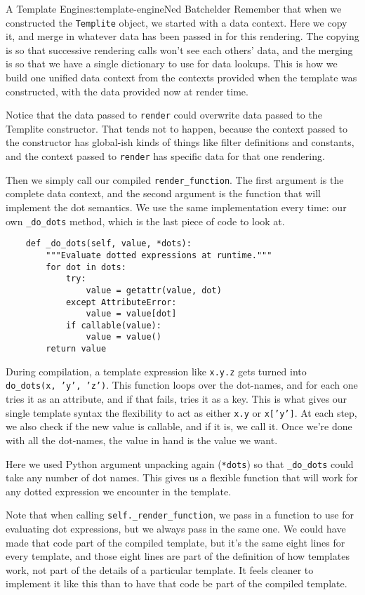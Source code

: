 \begin{aosachapter}{A Template Engine}{s:template-engine}{Ned Batchelder}
Remember that when we constructed the \texttt{Templite} object, we
started with a data context. Here we copy it, and merge in whatever data
has been passed in for this rendering. The copying is so that successive
rendering calls won't see each others' data, and the merging is so that
we have a single dictionary to use for data lookups. This is how we
build one unified data context from the contexts provided when the
template was constructed, with the data provided now at render time.

Notice that the data passed to \texttt{render} could overwrite data
passed to the Templite constructor. That tends not to happen, because
the context passed to the constructor has global-ish kinds of things
like filter definitions and constants, and the context passed to
\texttt{render} has specific data for that one rendering.

Then we simply call our compiled \texttt{render\_function}. The first
argument is the complete data context, and the second argument is the
function that will implement the dot semantics. We use the same
implementation every time: our own \texttt{\_do\_dots} method, which is
the last piece of code to look at.

\begin{verbatim}
    def _do_dots(self, value, *dots):
        """Evaluate dotted expressions at runtime."""
        for dot in dots:
            try:
                value = getattr(value, dot)
            except AttributeError:
                value = value[dot]
            if callable(value):
                value = value()
        return value
\end{verbatim}

During compilation, a template expression like \texttt{x.y.z} gets
turned into \texttt{do\_dots(x, 'y', 'z')}. This function loops over the
dot-names, and for each one tries it as an attribute, and if that fails,
tries it as a key. This is what gives our single template syntax the
flexibility to act as either \texttt{x.y} or \texttt{x{[}'y'{]}}. At
each step, we also check if the new value is callable, and if it is, we
call it. Once we're done with all the dot-names, the value in hand is
the value we want.

Here we used Python argument unpacking again (\texttt{*dots}) so that
\texttt{\_do\_dots} could take any number of dot names. This gives us a
flexible function that will work for any dotted expression we encounter
in the template.

Note that when calling \texttt{self.\_render\_function}, we pass in a
function to use for evaluating dot expressions, but we always pass in
the same one. We could have made that code part of the compiled
template, but it's the same eight lines for every template, and those
eight lines are part of the definition of how templates work, not part
of the details of a particular template. It feels cleaner to implement
it like this than to have that code be part of the compiled template.


\end{aosachapter}
